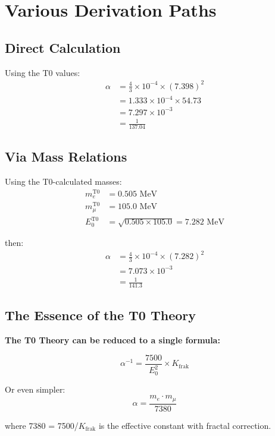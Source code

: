 \documentclass[12pt,a4paper]{article}
\newcommand{\Kfrak}{K_{\text{frak}}}
\newcommand{\Ezero}{E_0}
\begin{document}
	\section{Various Derivation Paths}
	
	\subsection{Direct Calculation}
	
	Using the T0 values:
	\begin{align}
		\alpha &= \frac{4}{3} \times 10^{-4} \times (7.398)^2\\
		&= 1.333 \times 10^{-4} \times 54.73\\
		&= 7.297 \times 10^{-3}\\
		&= \frac{1}{137.04}
	\end{align}
	
	\subsection{Via Mass Relations}
	
	Using the T0-calculated masses:
	\begin{align}
		m_e^{\text{T0}} &= 0.505 \text{ MeV}\\
		m_\mu^{\text{T0}} &= 105.0 \text{ MeV}\\
		\Ezero^{\text{T0}} &= \sqrt{0.505 \times 105.0} = 7.282 \text{ MeV}
	\end{align}
	
	then:
	\begin{align}
		\alpha &= \frac{4}{3} \times 10^{-4} \times (7.282)^2\\
		&= 7.073 \times 10^{-3}\\
		&= \frac{1}{141.3}
	\end{align}
	
	\subsection{The Essence of the T0 Theory}
	
	\begin{keyresult}
		\textbf{The T0 Theory can be reduced to a single formula:}
		
		\begin{equation}
			\boxed{\alpha^{-1} = \frac{7500}{\Ezero^2} \times \Kfrak}
		\end{equation}
		
		Or even simpler:
		\begin{equation}
			\boxed{\alpha = \frac{m_e \cdot m_\mu}{7380}}
		\end{equation}
		
		where 7380 = 7500/$\Kfrak$ is the effective constant with fractal correction.
	\end{keyresult}
	
\end{document}
